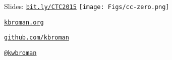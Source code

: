 \documentclass[12pt,t]{beamer}
\begin{document}
\begin{frame}[c]{}

\Large

Slides: \href{http://bit.ly/CTC2015}{\tt bit.ly/CTC2015} \quad
\texttt{[image: Figs/cc-zero.png]}

\vspace{10mm}

\href{http://kbroman.org}{\tt kbroman.org}

\vspace{10mm}

\href{https://github.com/kbroman}{\tt github.com/kbroman}

\vspace{10mm}

\href{https://twitter.com/kwbroman}{\tt @kwbroman}


\end{frame}
\end{document}
